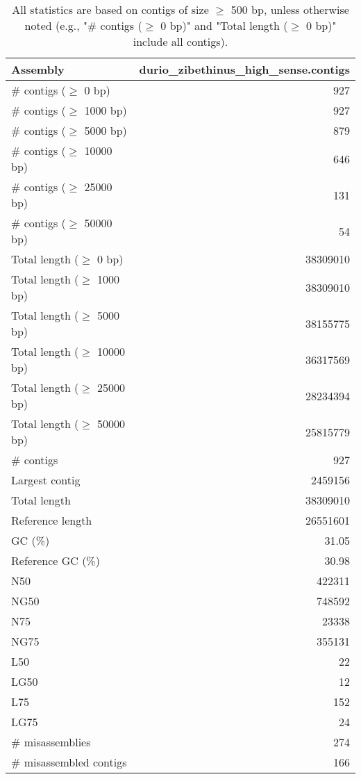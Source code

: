 \documentclass[12pt,a4paper]{article}
\begin{document}
\begin{table}[ht]
\begin{center}
\caption{All statistics are based on contigs of size $\geq$ 500 bp, unless otherwise noted (e.g., "\# contigs ($\geq$ 0 bp)" and "Total length ($\geq$ 0 bp)" include all contigs).}
\begin{tabular}{|l*{1}{|r}|}
\hline
Assembly & durio\_zibethinus\_high\_sense.contigs \\ \hline
\# contigs ($\geq$ 0 bp) & 927 \\ \hline
\# contigs ($\geq$ 1000 bp) & 927 \\ \hline
\# contigs ($\geq$ 5000 bp) & 879 \\ \hline
\# contigs ($\geq$ 10000 bp) & 646 \\ \hline
\# contigs ($\geq$ 25000 bp) & 131 \\ \hline
\# contigs ($\geq$ 50000 bp) & 54 \\ \hline
Total length ($\geq$ 0 bp) & 38309010 \\ \hline
Total length ($\geq$ 1000 bp) & 38309010 \\ \hline
Total length ($\geq$ 5000 bp) & 38155775 \\ \hline
Total length ($\geq$ 10000 bp) & 36317569 \\ \hline
Total length ($\geq$ 25000 bp) & 28234394 \\ \hline
Total length ($\geq$ 50000 bp) & 25815779 \\ \hline
\# contigs & 927 \\ \hline
Largest contig & 2459156 \\ \hline
Total length & 38309010 \\ \hline
Reference length & 26551601 \\ \hline
GC (\%) & 31.05 \\ \hline
Reference GC (\%) & 30.98 \\ \hline
N50 & 422311 \\ \hline
NG50 & 748592 \\ \hline
N75 & 23338 \\ \hline
NG75 & 355131 \\ \hline
L50 & 22 \\ \hline
LG50 & 12 \\ \hline
L75 & 152 \\ \hline
LG75 & 24 \\ \hline
\# misassemblies & 274 \\ \hline
\# misassembled contigs & 166 \\ \hline

\end{tabular}
\end{center}
\end{table}
\end{document}
